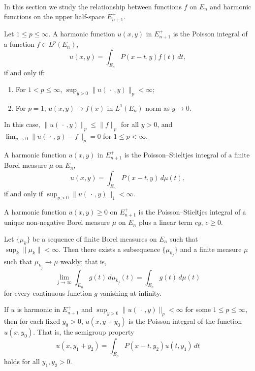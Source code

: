 In this section we study the relationship between functions $f$ on $E_n$ and harmonic functions on the upper half-space $E_{n+1}^+$.

\begin{theorem}\label{thm:c2-2-1}
Let $1 \leq p \leq \infty$. A harmonic function $u(x, y)$ in $E_{n+1}^+$ is the Poisson integral of a function $f \in L^p(E_n)$,
\begin{equation}\label{eq:c2-2-2}
u(x, y) = \int_{E_n} P(x - t, y) f(t)\,dt,
\end{equation}
if and only if:
\begin{enumerate}
\item[(a)] For $1 < p \leq \infty$, $\sup_{y > 0} \|u(\,\cdot\,, y)\|_p < \infty$;
\item[(b)] For $p = 1$, $u(x, y) \to f(x)$ in $L^1(E_n)$ norm as $y \to 0$.
\end{enumerate}
In this case, $\|u(\,\cdot\,, y)\|_p \leq \|f\|_p$ for all $y > 0$, and $\lim_{y \to 0} \|u(\,\cdot\,, y) - f\|_p = 0$ for $1 \leq p < \infty$.
\end{theorem}

\begin{theorem}\label{thm:c2-2-3}
A harmonic function $u(x, y)$ in $E_{n+1}^+$ is the Poisson--Stieltjes integral of a finite Borel measure $\mu$ on $E_n$,
\begin{equation}\label{eq:c2-2-4}
u(x, y) = \int_{E_n} P(x - t, y)\,d\mu(t),
\end{equation}
if and only if $\sup_{y > 0} \|u(\,\cdot\,, y)\|_1 < \infty$.
\end{theorem}

\begin{theorem}\label{thm:c2-2-5}
A harmonic function $u(x, y) \geq 0$ on $E_{n+1}^+$ is the Poisson--Stieltjes integral of a unique non-negative Borel measure $\mu$ on $E_n$ plus a linear term $cy$, $c \geq 0$.
\end{theorem}

\begin{lemma}\label{lem:c2-2-6}
Let $\{\mu_k\}$ be a sequence of finite Borel measures on $E_n$ such that $\sup_k \|\mu_k\| < \infty$. Then there exists a subsequence $\{\mu_{k_j}\}$ and a finite measure $\mu$ such that $\mu_{k_j} \to \mu$ weakly; that is,
\[
\lim_{j \to \infty} \int_{E_n} g(t)\,d\mu_{k_j}(t) = \int_{E_n} g(t)\,d\mu(t)
\]
for every continuous function $g$ vanishing at infinity.
\end{lemma}

\begin{lemma}\label{lem:c2-2-7}
If $u$ is harmonic in $E_{n+1}^+$ and $\sup_{y > 0} \|u(\,\cdot\,, y)\|_p < \infty$ for some $1 \leq p \leq \infty$, then for each fixed $y_0 > 0$, $u(x, y + y_0)$ is the Poisson integral of the function $u(x, y_0)$. That is, the semigroup property
\[
u(x, y_1 + y_2) = \int_{E_n} P(x - t, y_2) u(t, y_1)\,dt
\]
holds for all $y_1, y_2 > 0$.
\end{lemma}

